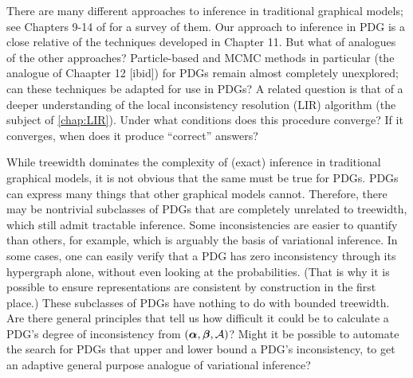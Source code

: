 There are many different approaches to inference in traditional graphical models;
see Chapters 9-14 of \citet{KF09} for a survey of them.
Our approach to inference in PDG is a close relative of the techniques developed in Chapter 11. But what of analogues of the other approaches? 
Particle-based and MCMC methods in particular (the analogue of Chaapter 12 [ibid])
for PDGs remain almost completely unexplored; can these techniques be adapted for use in PDGs?
%    
%
A related question is that of a deeper understanding of the local inconsistency resolution (LIR) algorithm (the subject of \cref{chap:LIR}). 
Under what conditions does this procedure converge?
If it converges, when does it produce ``correct'' answers?
%


While treewidth dominates the complexity of (exact) inference in traditional graphical models, it is not obvious that the same must be true for PDGs. 
PDGs can express many things that other graphical models cannot. 
Therefore, there may be nontrivial subclasses of PDGs that are completely unrelated to treewidth, which still admit tractable inference. 
%
Some inconsistencies are easier to quantify than others, for example,
    which is arguably the basis of variational inference.
In some cases, one can easily verify that a PDG has zero inconsistency through its hypergraph alone, without even looking at the probabilities.
(That is why it is possible to ensure representations are consistent by construction in the first place.)
These subclasses of PDGs have nothing to do with bounded treewidth. 
Are there general principles that tell us how difficult it could be to calculate a PDG's degree of inconsistency from $(\boldsymbol\alpha,\boldsymbol\beta,\mathcal A)$?
Might it be possible to automate the 
    search for PDGs that upper and lower bound a PDG's inconsistency,
    to get an adaptive general purpose analogue of variational inference?
    
